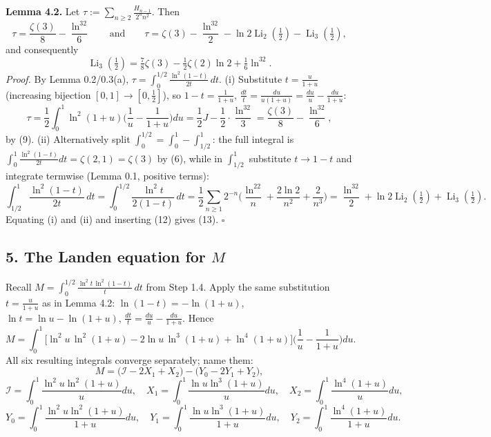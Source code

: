 \documentclass[11pt]{article}
\theoremstyle{remark}
\begin{document}
\textbf{Lemma 4.2.} Let $\tau:=\sum_{n\ge2}\frac{H_{n-1}}{2^n n^2}$. Then
\[
\tau=\frac{\zeta(3)}{8}-\frac{\ln^32}{6}
\qquad\text{and}\qquad
\tau=\zeta(3)-\frac{\ln^32}{2}-\ln2\operatorname{Li}_2(\tfrac12)-\operatorname{Li}_3(\tfrac12),
\]
and consequently
\begin{equation}
\operatorname{Li}_3(\tfrac12)=\tfrac78\zeta(3)-\tfrac12\zeta(2)\ln2+\tfrac16\ln^32. \tag{13}
\end{equation}
\textit{Proof.} By Lemma 0.2/0.3(a), $\tau=\int_0^{1/2}\frac{\ln^2(1-t)}{2t}\,dt$.
(i) Substitute $t=\frac{u}{1+u}$ (increasing bijection $[0,1]\to[0,\tfrac12]$), so $1-t=\frac1{1+u}$,
$\frac{dt}{t}=\frac{du}{u(1+u)}=\frac{du}{u}-\frac{du}{1+u}$:
\[
\tau=\frac12\int_0^1\ln^2(1+u)\Big(\frac1u-\frac1{1+u}\Big)du
=\frac12 J-\frac12\cdot\frac{\ln^32}{3}=\frac{\zeta(3)}{8}-\frac{\ln^32}{6},
\]
by (9). (ii) Alternatively split $\int_0^{1/2}=\int_0^1-\int_{1/2}^1$: the full integral is
$\int_0^1\frac{\ln^2(1-t)}{2t}dt=\zeta(2,1)=\zeta(3)$ by (6), while in
$\int_{1/2}^1$ substitute $t\to1-t$ and integrate termwise (Lemma 0.1, positive terms):
\[
\int_{1/2}^{1}\frac{\ln^2(1-t)}{2t}\,dt=\int_0^{1/2}\frac{\ln^2t}{2(1-t)}\,dt
=\frac12\sum_{n\ge1}2^{-n}\Big(\frac{\ln^22}{n}+\frac{2\ln2}{n^2}+\frac{2}{n^3}\Big)
=\frac{\ln^32}2+\ln2\operatorname{Li}_2(\tfrac12)+\operatorname{Li}_3(\tfrac12).
\]
Equating (i) and (ii) and inserting (12) gives (13). $\square$

\subsection*{5. The Landen equation for $M$}

Recall $M=\displaystyle\int_0^{1/2}\frac{\ln^2t\,\ln^2(1-t)}{t}\,dt$ from Step 1.4. Apply the same
substitution $t=\frac{u}{1+u}$ as in Lemma 4.2: $\ln(1-t)=-\ln(1+u)$, $\ln t=\ln u-\ln(1+u)$,
$\frac{dt}{t}=\frac{du}{u}-\frac{du}{1+u}$. Hence
\[
M=\int_0^1\Big[\ln^2u\,\ln^2(1+u)-2\ln u\,\ln^3(1+u)+\ln^4(1+u)\Big]
\Big(\frac1u-\frac1{1+u}\Big)du .
\]
All six resulting integrals converge separately; name them:
\begin{equation}
M=\big(\mathcal I-2X_1+X_2\big)-\big(Y_0-2Y_1+Y_2\big), \tag{14}
\end{equation}
\[
\mathcal I=\int_0^1\frac{\ln^2u\ln^2(1+u)}{u}du,\quad
X_1=\int_0^1\frac{\ln u\ln^3(1+u)}{u}du,\quad
X_2=\int_0^1\frac{\ln^4(1+u)}{u}du,
\]
\[
Y_0=\int_0^1\frac{\ln^2u\ln^2(1+u)}{1+u}du,\quad
Y_1=\int_0^1\frac{\ln u\ln^3(1+u)}{1+u}du,\quad
Y_2=\int_0^1\frac{\ln^4(1+u)}{1+u}du .
\]
\end{document}
